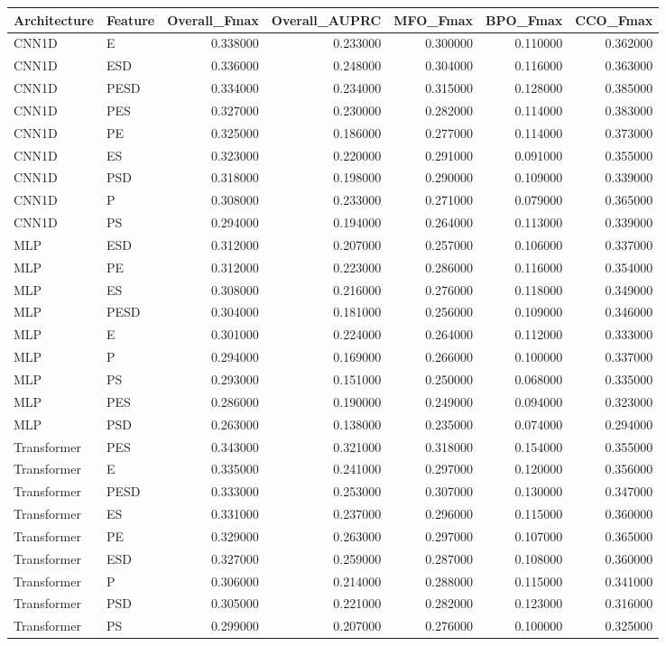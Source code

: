 \begin{tabular}{llrrrrr}
\toprule
Architecture & Feature & Overall_Fmax & Overall_AUPRC & MFO_Fmax & BPO_Fmax & CCO_Fmax \\
\midrule
CNN1D & E & 0.338000 & 0.233000 & 0.300000 & 0.110000 & 0.362000 \\
CNN1D & ESD & 0.336000 & 0.248000 & 0.304000 & 0.116000 & 0.363000 \\
CNN1D & PESD & 0.334000 & 0.234000 & 0.315000 & 0.128000 & 0.385000 \\
CNN1D & PES & 0.327000 & 0.230000 & 0.282000 & 0.114000 & 0.383000 \\
CNN1D & PE & 0.325000 & 0.186000 & 0.277000 & 0.114000 & 0.373000 \\
CNN1D & ES & 0.323000 & 0.220000 & 0.291000 & 0.091000 & 0.355000 \\
CNN1D & PSD & 0.318000 & 0.198000 & 0.290000 & 0.109000 & 0.339000 \\
CNN1D & P & 0.308000 & 0.233000 & 0.271000 & 0.079000 & 0.365000 \\
CNN1D & PS & 0.294000 & 0.194000 & 0.264000 & 0.113000 & 0.339000 \\
MLP & ESD & 0.312000 & 0.207000 & 0.257000 & 0.106000 & 0.337000 \\
MLP & PE & 0.312000 & 0.223000 & 0.286000 & 0.116000 & 0.354000 \\
MLP & ES & 0.308000 & 0.216000 & 0.276000 & 0.118000 & 0.349000 \\
MLP & PESD & 0.304000 & 0.181000 & 0.256000 & 0.109000 & 0.346000 \\
MLP & E & 0.301000 & 0.224000 & 0.264000 & 0.112000 & 0.333000 \\
MLP & P & 0.294000 & 0.169000 & 0.266000 & 0.100000 & 0.337000 \\
MLP & PS & 0.293000 & 0.151000 & 0.250000 & 0.068000 & 0.335000 \\
MLP & PES & 0.286000 & 0.190000 & 0.249000 & 0.094000 & 0.323000 \\
MLP & PSD & 0.263000 & 0.138000 & 0.235000 & 0.074000 & 0.294000 \\
Transformer & PES & 0.343000 & 0.321000 & 0.318000 & 0.154000 & 0.355000 \\
Transformer & E & 0.335000 & 0.241000 & 0.297000 & 0.120000 & 0.356000 \\
Transformer & PESD & 0.333000 & 0.253000 & 0.307000 & 0.130000 & 0.347000 \\
Transformer & ES & 0.331000 & 0.237000 & 0.296000 & 0.115000 & 0.360000 \\
Transformer & PE & 0.329000 & 0.263000 & 0.297000 & 0.107000 & 0.365000 \\
Transformer & ESD & 0.327000 & 0.259000 & 0.287000 & 0.108000 & 0.360000 \\
Transformer & P & 0.306000 & 0.214000 & 0.288000 & 0.115000 & 0.341000 \\
Transformer & PSD & 0.305000 & 0.221000 & 0.282000 & 0.123000 & 0.316000 \\
Transformer & PS & 0.299000 & 0.207000 & 0.276000 & 0.100000 & 0.325000 \\
\bottomrule
\end{tabular}
